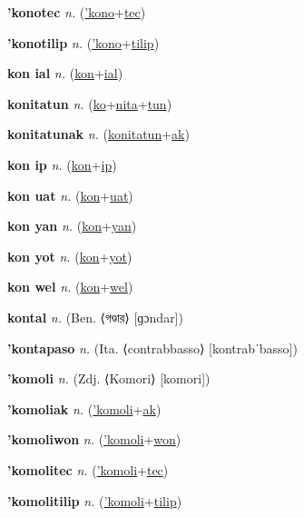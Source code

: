 \textbf{\hypertarget{'konotec}{'konotec}} \textit{n.} (\hyperlink{'kono}{'kono}+\allowbreak \hyperlink{tec}{tec})


\textbf{\hypertarget{'konotilip}{'konotilip}} \textit{n.} (\hyperlink{'kono}{'kono}+\allowbreak \hyperlink{tilip}{tilip})


\textbf{\hypertarget{kon ial}{kon ial}} \textit{n.} (\hyperlink{kon}{kon}+\allowbreak \hyperlink{ial}{ial})


\textbf{\hypertarget{konitatun}{konitatun}} \textit{n.} (\hyperlink{ko}{ko}+\allowbreak \hyperlink{nita}{nita}+\allowbreak \hyperlink{tun}{tun})


\textbf{\hypertarget{konitatunak}{konitatunak}} \textit{n.} (\hyperlink{konitatun}{konitatun}+\allowbreak \hyperlink{ak}{ak})


\textbf{\hypertarget{kon ip}{kon ip}} \textit{n.} (\hyperlink{kon}{kon}+\allowbreak \hyperlink{ip}{ip})


\textbf{\hypertarget{kon uat}{kon uat}} \textit{n.} (\hyperlink{kon}{kon}+\allowbreak \hyperlink{uat}{uat})


\textbf{\hypertarget{kon yan}{kon yan}} \textit{n.} (\hyperlink{kon}{kon}+\allowbreak \hyperlink{yan}{yan})


\textbf{\hypertarget{kon yot}{kon yot}} \textit{n.} (\hyperlink{kon}{kon}+\allowbreak \hyperlink{yot}{yot})


\textbf{\hypertarget{kon wel}{kon wel}} \textit{n.} (\hyperlink{kon}{kon}+\allowbreak \hyperlink{wel}{wel})


\textbf{\hypertarget{kontal}{kontal}} \textit{n.} (Ben. ⟨{\bengali{}গণ্ডার}⟩ [ɡɔndar])


\textbf{\hypertarget{'kontapaso}{'kontapaso}} \textit{n.} (Ita. ⟨contrabbasso⟩ [kontrabˈbasso])


\textbf{\hypertarget{'komoli}{'komoli}} \textit{n.} (Zdj. ⟨Komori⟩ [komori])


\textbf{\hypertarget{'komoliak}{'komoliak}} \textit{n.} (\hyperlink{'komoli}{'komoli}+\allowbreak \hyperlink{ak}{ak})


\textbf{\hypertarget{'komoliwon}{'komoliwon}} \textit{n.} (\hyperlink{'komoli}{'komoli}+\allowbreak \hyperlink{won}{won})


\textbf{\hypertarget{'komolitec}{'komolitec}} \textit{n.} (\hyperlink{'komoli}{'komoli}+\allowbreak \hyperlink{tec}{tec})


\textbf{\hypertarget{'komolitilip}{'komolitilip}} \textit{n.} (\hyperlink{'komoli}{'komoli}+\allowbreak \hyperlink{tilip}{tilip})


